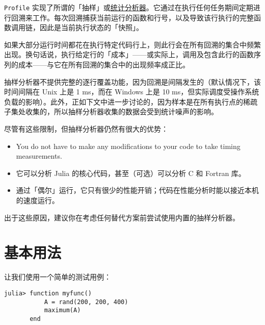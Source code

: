 \texttt{Profile} 实现了所谓的「抽样」或\href{https://en.wikipedia.org/wiki/Profiling\_(computer\_programming)}{统计分析器}。它通过在执行任何任务期间定期进行回溯来工作。每次回溯捕获当前运行的函数和行号，以及导致该行执行的完整函数调用链，因此是当前执行状态的「快照」。



如果大部分运行时间都花在执行特定代码行上，则此行会在所有回溯的集合中频繁出现。换句话说，执行给定行的「成本」——或实际上，调用及包含此行的函数序列的成本——与它在所有回溯的集合中的出现频率成正比。



抽样分析器不提供完整的逐行覆盖功能，因为回溯是间隔发生的（默认情况下，该时间间隔在 Unix 上是 1 ms，而在 Windows 上是 10 ms，但实际调度受操作系统负载的影响）。此外，正如下文中进一步讨论的，因为样本是在所有执行点的稀疏子集处收集的，所以抽样分析器收集的数据会受到统计噪声的影响。



尽管有这些限制，但抽样分析器仍然有很大的优势：



\begin{itemize}
\item You do not have to make any modifications to your code to take timing measurements.


\item 它可以分析 Julia 的核心代码，甚至（可选）可以分析 C 和 Fortran 库。


\item 通过「偶尔」运行，它只有很少的性能开销；代码在性能分析时能以接近本机的速度运行。

\end{itemize}


出于这些原因，建议你在考虑任何替代方案前尝试使用内置的抽样分析器。



\hypertarget{17553054695497272357}{}


\section{基本用法}



让我们使用一个简单的测试用例：




\begin{verbatim}
julia> function myfunc()
           A = rand(200, 200, 400)
           maximum(A)
       end
\end{verbatim}



